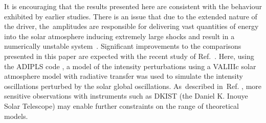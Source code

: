 \documentclass[physics,article,accept,pdftex,moreauthors]{Definitions/mdpi}
\begin{document}
It is encouraging that the results presented here are consistent with the behaviour exhibited by earlier {studies}.
There is an issue that due to the extended nature of the driver, the~amplitudes are responsible for delivering vast quantities of energy into the solar atmosphere inducing extremely large shocks and result in a numerically unstable system~\cite{Santamaria2015}. Significant improvements to the comparisons presented in this paper are expected with the  recent 
 {study} of {Ref.}~\cite{Kostogryz2021}. Here, using the ADIPLS {code} %
\cite{Christensen-Dalsgaard2008}, a model of the intensity 
perturbations 
using a VALIIIc solar atmosphere model with radiative transfer was used to simulate the intensity oscillations perturbed by the solar global oscillations. As~described 
in~{Ref.} 
, more sensitive observations with instruments such as DKIST {(the Daniel K. Inouye Solar Telescope)} %
may enable further constraints on the range of theoretical models. 








\vspace{6pt}
\end{document}
